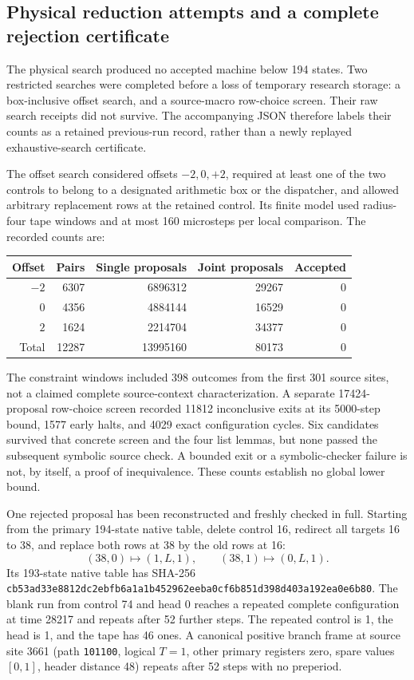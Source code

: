 \subsection{Physical reduction attempts and a complete rejection certificate}
The physical search produced no accepted machine below 194 states. Two
restricted searches were completed before a loss of temporary research
storage: a box-inclusive offset search, and a source-macro row-choice screen.
Their raw search receipts did not survive. The accompanying JSON therefore
labels their counts as a retained previous-run record, rather than a newly
replayed exhaustive-search certificate.

The offset search considered offsets $-2,0,+2$, required at least one of the
two controls to belong to a designated arithmetic box or the dispatcher, and
allowed arbitrary replacement rows at the retained control. Its finite model
used radius-four tape windows and at most 160 microsteps per local comparison.
The recorded counts are:
\begin{center}
\begin{tabular}{r|r|r|r|r}
Offset & Pairs & Single proposals & Joint proposals & Accepted\\\hline
$-2$ & 6307 & 6896312 & 29267 & 0\\
$0$ & 4356 & 4884144 & 16529 & 0\\
$2$ & 1624 & 2214704 & 34377 & 0\\\hline
Total & 12287 & 13995160 & 80173 & 0
\end{tabular}
\end{center}
The constraint windows included 398 outcomes from the first 301 source sites,
not a claimed complete source-context characterization. A separate 17424-proposal
row-choice screen recorded 11812 inconclusive exits at its 5000-step bound,
1577 early halts, and 4029 exact configuration cycles. Six candidates survived
that concrete screen and the four list lemmas, but none passed the subsequent
symbolic source check. A bounded exit or a symbolic-checker failure is not, by
itself, a proof of inequivalence. These counts establish no global lower bound.

One rejected proposal has been reconstructed and freshly checked in full.
Starting from the primary 194-state native table, delete control 16, redirect
all targets 16 to 38, and replace both rows at 38 by the old rows at 16:
\[
(38,0)\mapsto(1,L,1),\qquad
(38,1)\mapsto(0,L,1).
\]
Its 193-state native table has SHA-256
\texttt{cb53ad33e8812dc2ebfb6a1a1b452962eeba0cf6b851d398d403a192ea0e6b80}.
The blank run from control 74 and head 0 reaches a repeated complete
configuration at time 28217 and repeats after 52 further steps. The repeated
control is 1, the head is 1, and the tape has 46 ones. A canonical positive branch
frame at source site 3661 (path \texttt{101100}, logical $T=1$, other primary
registers zero, spare values $[0,1]$, header distance 48) repeats after 52 steps
with no preperiod.

